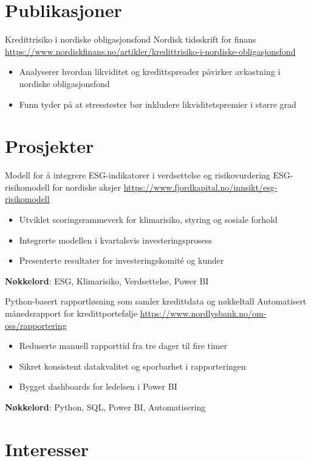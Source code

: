 \documentclass[a4paper, serif, 10pt]{moderncv}
\begin{document}
\section{Publikasjoner}

        {Kredittrisiko i nordiske obligasjonsfond}
        {Nordisk tidsskrift for finans}
        {\url{https://www.nordiskfinans.no/artikler/kredittrisiko-i-nordiske-obligasjonsfond}}
        {}
        {\begin{itemize}
\item Analyserer hvordan likviditet og kredittspreader påvirker avkastning i nordiske obligasjonsfond
\item Funn tyder på at stresstester bør inkludere likviditetspremier i større grad
\end{itemize}}
\section{Prosjekter}

        {Modell for å integrere ESG-indikatorer i verdsettelse og risikovurdering}
        {ESG-risikomodell for nordiske aksjer}
        {\url{https://www.fjordkapital.no/innsikt/esg-risikomodell}}
        {}
        {\begin{itemize}
\item Utviklet scoringsrammeverk for klimarisiko, styring og sosiale forhold
\item Integrerte modellen i kvartalsvis investeringsprosess
\item Presenterte resultater for investeringskomité og kunder
\end{itemize}
\textbf{Nøkkelord}: ESG, Klimarisiko, Verdsettelse, Power BI}

        {Python-basert rapportløsning som samler kredittdata og nøkkeltall}
        {Automatisert månedsrapport for kredittportefølje}
        {\url{https://www.nordlysbank.no/om-oss/rapportering}}
        {}
        {\begin{itemize}
\item Reduserte manuell rapporttid fra tre dager til fire timer
\item Sikret konsistent datakvalitet og sporbarhet i rapporteringen
\item Bygget dashboards for ledelsen i Power BI
\end{itemize}
\textbf{Nøkkelord}: Python, SQL, Power BI, Automatisering}
\section{Interesser}
\end{document}
